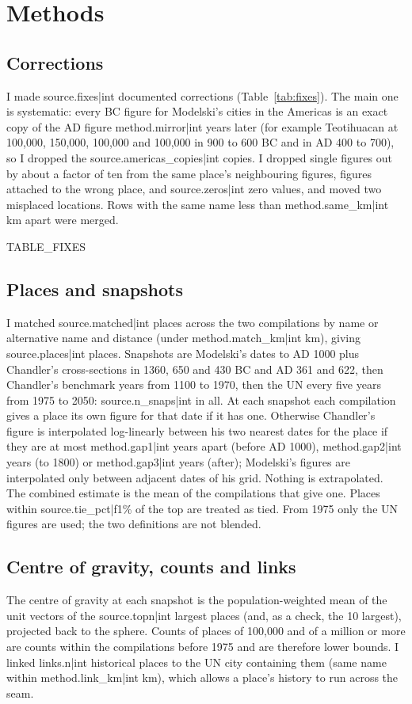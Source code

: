 \documentclass[11pt,a4paper]{article}
\begin{document}
\section{Methods}
\subsection{Corrections}
I made {{source.fixes|int}} documented corrections (Table~\ref{tab:fixes}). The main one is systematic: every BC figure for Modelski's cities in the Americas is an exact copy of the AD figure {{method.mirror|int}} years later (for example Teotihuacan at 100,000, 150,000, 100,000 and 100,000 in 900 to 600 BC and in AD 400 to 700), so I dropped the {{source.americas_copies|int}} copies. I dropped single figures out by about a factor of ten from the same place's neighbouring figures, figures attached to the wrong place, and {{source.zeros|int}} zero values, and moved two misplaced locations. Rows with the same name less than {{method.same_km|int}} km apart were merged.

{{TABLE_FIXES}}

\subsection{Places and snapshots}
I matched {{source.matched|int}} places across the two compilations by name or alternative name and distance (under {{method.match_km|int}} km), giving {{source.places|int}} places. Snapshots are Modelski's dates to AD 1000 plus Chandler's cross-sections in 1360, 650 and 430 BC and AD 361 and 622, then Chandler's benchmark years from 1100 to 1970, then the UN every five years from 1975 to 2050: {{source.n_snaps|int}} in all. At each snapshot each compilation gives a place its own figure for that date if it has one. Otherwise Chandler's figure is interpolated log-linearly between his two nearest dates for the place if they are at most {{method.gap1|int}} years apart (before AD 1000), {{method.gap2|int}} years (to 1800) or {{method.gap3|int}} years (after); Modelski's figures are interpolated only between adjacent dates of his grid. Nothing is extrapolated. The combined estimate is the mean of the compilations that give one. Places within {{source.tie_pct|f1}}\% of the top are treated as tied. From 1975 only the UN figures are used; the two definitions are not blended.

\subsection{Centre of gravity, counts and links}
The centre of gravity at each snapshot is the population-weighted mean of the unit vectors of the {{source.topn|int}} largest places (and, as a check, the 10 largest), projected back to the sphere. Counts of places of 100,000 and of a million or more are counts within the compilations before 1975 and are therefore lower bounds. I linked {{links.n|int}} historical places to the UN city containing them (same name within {{method.link_km|int}} km), which allows a place's history to run across the seam.
\end{document}
